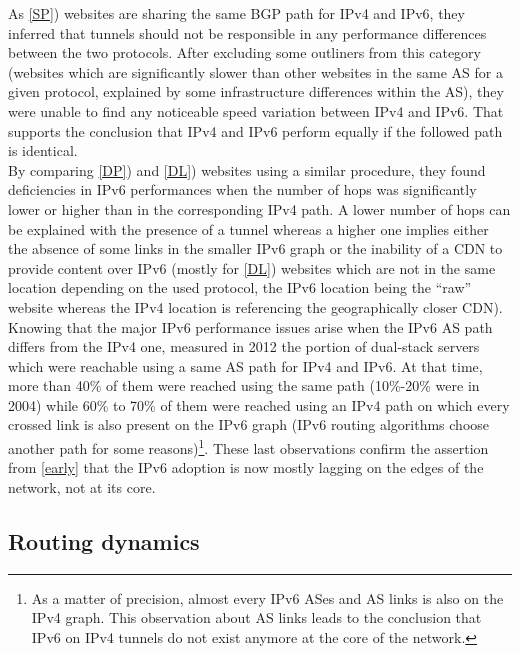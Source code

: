 \documentclass[journal]{IEEEtran}
\begin{document}
As \ref{SP}) websites are sharing the same BGP path for IPv4 and IPv6, they
inferred that tunnels should not be responsible in any performance differences
between the two protocols. After excluding some outliners from this category
(websites which are significantly slower than other websites in the same AS for
a given protocol, explained by some infrastructure differences within the AS),
they were unable to find any noticeable speed variation between IPv4 and IPv6.
That supports the conclusion that IPv4 and IPv6 perform equally if the followed
path is identical. \\
By comparing \ref{DP}) and \ref{DL}) websites using a similar
procedure, they found deficiencies in IPv6 performances when the
number of hops was significantly lower or higher than in the corresponding IPv4
path. A lower number of hops can be explained with the presence of a tunnel
whereas a higher one implies either the absence of some links in the smaller
IPv6 graph or the inability of a CDN to provide content over IPv6
(mostly for \ref{DL}) websites which are not in the same location depending on
the used protocol, the IPv6 location being the \enquote{raw} website whereas the
IPv4 location is referencing the geographically closer CDN).\\

Knowing that the major IPv6 performance issues arise when the IPv6 AS path
differs from the IPv4 one, \cite{paper4} measured in 2012 the portion of
dual-stack servers which were reachable using a same AS path for IPv4 and IPv6.
At that time, more than 40\% of them were reached using the same path (10\%-20\%
were in 2004) while 60\% to 70\% of them were reached using an IPv4
path on which every crossed link is also present on the IPv6 graph (IPv6 routing
algorithms choose another path for some reasons)\footnote{
As a matter of precision, almost every IPv6 ASes and AS links is also on the
IPv4 graph. This observation about AS links leads to the conclusion that IPv6 on
IPv4 tunnels do not exist anymore at the core of the network.}.
These last observations confirm the assertion from \ref{early}
that the IPv6 adoption is now mostly lagging on the edges of the network, not at
its core.

\subsection{Routing dynamics}
\end{document}

